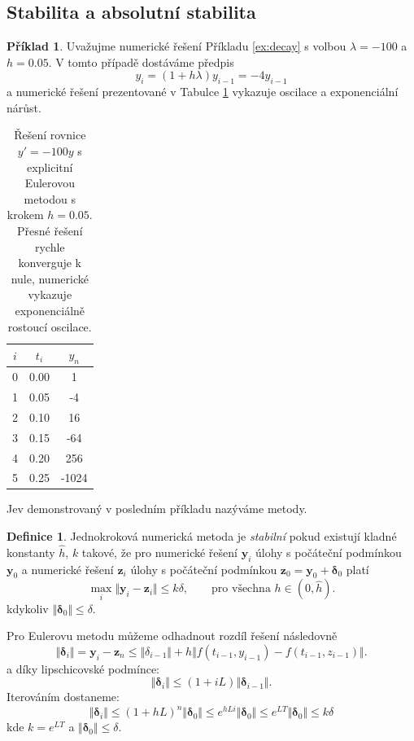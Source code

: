 \documentclass[a4paper, 12pt]{book}
\theoremstyle{definition}
\newtheorem{definition}[theorem]{Definice}
\newtheorem{example}[theorem]{Příklad}
\def\vc#1{\mathbf{\boldsymbol{#1}}}     %
\def\norm#1{\bigl\Vert#1\bigr\Vert} %
\def\df#1{\emph{#1}}
\begin{document}
\subsection{Stabilita a absolutní stabilita}
\begin{example}
Uvažujme numerické řešení Příkladu  \ref{ex:decay} s volbou $\lambda=-100$ a $h=0.05$. V tomto případě dostáváme předpis
\[
  y_i = (1 + h\lambda) y_{i-1} = -4 y_{i-1}
\]
a numerické řešení prezentované v Tabulce \ref{table:instability} vykazuje oscilace a exponenciální nárůst. 
\end{example}

\begin{table}
\centering
\begin{tabular}{|c|c|c|}
\hline
$i$ & $t_i$ & $y_n$\\ 
\hline
0 & 0.00 & 1\\ 
\hline
1 & 0.05 & -4\\ 
\hline
2 & 0.10 & 16\\ 
\hline
3 & 0.15 & -64\\ 
\hline
4 & 0.20 & 256\\ 
\hline
5 & 0.25 & -1024\\ 
\hline
\hline\end{tabular}
\caption{Řešení rovnice $y'=-100y$ s explicitní Eulerovou metodou s krokem $h=0.05$. 
Přesné řešení rychle konverguje k nule, numerické vykazuje exponenciálně rostoucí oscilace.} 
\label{table:instability}
\end{table}

Jev demonstrovaný v posledním příkladu nazýváme  metody.
\begin{definition}
 Jednokroková numerická metoda je \df{stabilní} pokud existují kladné konstanty $\hat h$, $k$ takové, že pro numerické řešení $\vc y_i$ úlohy s počáteční podmínkou $\vc y_0$ 
 a numerické řešení $\vc z_i$ úlohy s počáteční podmínkou $\vc z_0 = \vc y_0 + \vc \delta_0$ platí 
 \[
   \max_{i} \norm{\vc y_i - \vc z_i} \le k \delta,\qquad \text{pro všechna }h\in(0,\hat h).
 \]
 kdykoliv $\norm{\vc \delta_0} \le \delta$.
\end{definition}
Pro Eulerovu metodu můžeme odhadnout rozdíl řešení následovně
\[
  \norm{\vc\delta_i} = \vc y_i - \vc z_n \le \norm{\delta_{i-1}} + h\norm{f(t_{i-1}, y_{i-1}) - f(t_{i-1}, z_{i-1}) }.
\]
a díky lipschicovské podmínce:
\[
  \norm{\vc\delta_i} \le (1 + iL)\norm{\vc\delta_{i-1}}.
\]
Iterováním dostaneme:
\[
  \norm{\vc\delta_i} \le (1+hL)^n\norm{\vc\delta_0} \le e^{hLi}\norm{\vc\delta_0} \le e^{LT}\norm{\vc\delta_0} \le k \delta
\]
kde $k = e^{LT}$ a $\norm{\vc\delta_0} \le \delta$.
\end{document}

